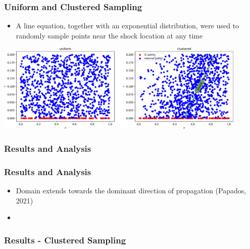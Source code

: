 \documentclass[aspectratio=169]{beamer}
\begin{document}
\begin{frame}\frametitle{Uniform and Clustered Sampling}
	\begin{itemize}
		\item A line equation, together with an exponential distribution, were used to randomly sample points near
		the shock location at any time
	\end{itemize}
	
	\begin{center}
		\includegraphics[width=0.9\textwidth]{Figures/points_distribution.pdf}
	\end{center}
	
	
\end{frame}




\begin{frame}\frametitle{Results and Analysis}
	
	
\end{frame}



\begin{frame}\frametitle{Results and Analysis}
	\begin{itemize}
		\item Domain extends towards the dominant direction of propagation \tiny (Papados, 2021)
		\item  
	\end{itemize}
	
	
\end{frame}



\begin{frame}\frametitle{Results - Clustered Sampling}
	
	
\end{frame}
\end{document}
